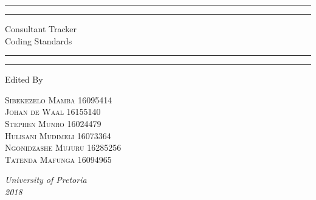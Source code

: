 \documentclass[a4paper,12pt]{report}
\begin{document}
\begin{titlepage} %
	
	\centering %
	
	\scshape %
	
	\vspace*{\baselineskip} %
	
	
	\rule{\textwidth}{1.6pt}\vspace*{-\baselineskip}\vspace*{2pt} %
	\rule{\textwidth}{0.4pt} %
	
	\vspace{0.75\baselineskip} %
	
	{\LARGE Consultant Tracker\\Coding Standards} %
	
	\vspace{0.75\baselineskip} %
	
	\rule{\textwidth}{0.4pt}\vspace*{-\baselineskip}\vspace{3.2pt} %
	\rule{\textwidth}{1.6pt} %
	
	\vspace{2\baselineskip} %
	
	
	
	Edited By
	
	\vspace{0.5\baselineskip} %
	
	{\scshape\Large Sibekezelo Mamba 16095414 \\ Johan de Waal 16155140 \\ Stephen Munro 16024479\\ Hulisani Mudimeli 16073364 \\ Ngonidzashe Mujuru 16285256  \\ Tatenda Mafunga 16094965\\} %
	
	\vspace{0.5\baselineskip} %
	
	\textit{University of Pretoria \\2018} %
	
	\vfill %
	
\end{titlepage}
\newpage
\tableofcontents
\newpage
\end{document}
